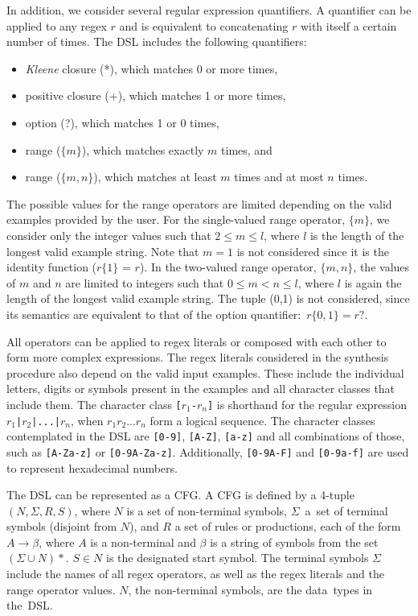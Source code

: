 In addition, we consider several regular expression quantifiers. A quantifier can be applied to any regex \(r\) and is equivalent to concatenating \(r\) with itself a certain number of times. The \ac{DSL} includes the following quantifiers:
\begin{itemize}[topsep=0pt]
    \item \textit{Kleene} closure (*), which matches 0 or more times,
    \item positive closure (+), which matches 1 or more times,
    \item option (?), which matches 1 or 0 times,
    \item range (\(\{m\}\)), which matches exactly \(m\) times, and
    \item range (\(\{m,n\}\)), which matches at least \(m\) times and at most \(n\) times.
\end{itemize}

\noindent
The possible values for the range operators are limited depending on the valid examples provided by the user. For the single-valued range operator, \(\{m\}\), we consider only the integer values such that \(2 \le m \le l\), where \(l\) is the length of the longest valid example string. Note that \(m = 1\) is not considered since it is the identity function (\(r\)\(\{1\}\) = \(r\)).
In the two-valued range operator, \(\{m,n\}\), the values of \(m\) and \(n\) are limited to integers such that \(0 \le m < n \leq l\), where \(l\) is again the length of the longest valid example string. The tuple (0,1) is not considered, since its semantics are equivalent to that of the option quantifier:~\(r\{0,1\} = r?\).


All operators can be applied to regex literals or composed with each other to form more complex expressions.
The regex literals considered in the synthesis procedure also depend on the valid input examples. These include the individual letters, digits or symbols present in the examples and all character classes that include them.
The character class \texttt{[\(r_1\)-\(r_n\)]} is shorthand for the regular expression  \texttt{\(r_1\)|\(r_2\)|...|\(r_n\)}, when \(r_1 r_2 ... r_n\) form a logical sequence.
The character classes contemplated in the DSL are \texttt{[0-9]}, \texttt{[A-Z]}, \texttt{[a-z]} and all combinations of those, such as \texttt{[A-Za-z]} or \texttt{[0-9A-Za-z]}. Additionally, \texttt{[0-9A-F]} and \texttt{[0-9a-f]} are used to represent hexadecimal numbers.

The DSL can be represented as a \ac{CFG}. A \ac{CFG} is defined by a 4-tuple \((N, \Sigma, R, S)\), where \(N\) is a set of non-terminal symbols, \(\Sigma\)~a~set of terminal symbols (disjoint from \(N\)), and \(R\) a set of rules or productions, each of the form \(A \to \beta\), where \(A\) is a non-terminal and \(\beta\) is a string of symbols from the set \((\Sigma \cup N)*\). \(S \in N\) is the designated start symbol.
The terminal symbols \(\Sigma\) include the names of all regex operators, as well as the regex literals and the range operator values.
\(N\), the non-terminal symbols, are the data~types in the~DSL.

